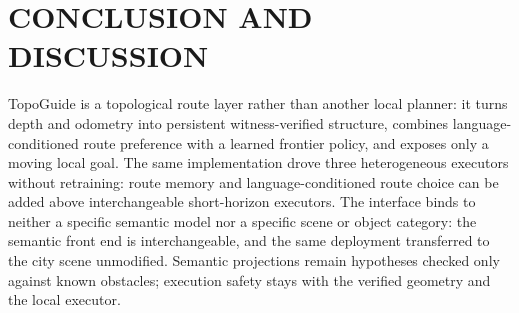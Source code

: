 \documentclass[letterpaper,10pt,conference]{ieeeconf}
\begin{document}
\section{CONCLUSION AND DISCUSSION}
\label{sec:discussion}
TopoGuide is a topological route layer rather than another local planner:
it turns depth and odometry into persistent witness-verified structure,
combines language-conditioned route preference with a learned frontier
policy, and exposes only a moving local goal.  The same implementation
drove three heterogeneous executors without retraining: route memory
and language-conditioned route choice
can be added above interchangeable short-horizon executors.  The
interface binds to neither a specific semantic model nor a specific scene
or object category: the semantic front end is interchangeable, and the
same deployment transferred to the city scene unmodified.
Semantic projections remain hypotheses checked only against known
obstacles; execution safety stays with the verified geometry and
the local executor.
\end{document}
